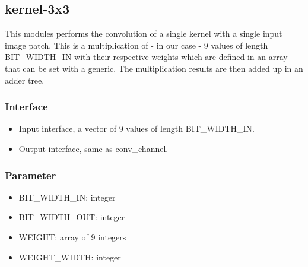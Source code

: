 \subsection{kernel-3x3}

This modules performs the convolution of a single kernel with a single input image patch. This is a multiplication of - in our case - 9 values of length BIT\_WIDTH\_IN with their respective weights which are defined in an array that can be set with a generic. The multiplication results are then added up in an adder tree.

\subsubsection{Interface}
\begin{itemize}
	\item Input interface, a vector of 9 values of length BIT\_WIDTH\_IN.
	\item Output interface, same as conv\_channel.
\end{itemize}

\subsubsection{Parameter}
\begin{itemize}
	\item BIT\_WIDTH\_IN: integer
	\item BIT\_WIDTH\_OUT: integer
	\item WEIGHT: array of 9 integers
	\item WEIGHT\_WIDTH: integer
\end{itemize}